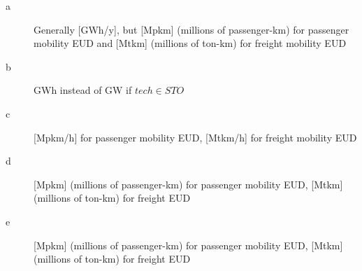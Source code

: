 \documentclass[
]{article}
\begin{document}
\label{citations}
\begin{description}
\item[\label{a}{a}]
Generally {[}GWh/y{]}, but {[}Mpkm{]} (millions of passenger-km) for
passenger mobility EUD and {[}Mtkm{]} (millions of ton-km) for freight
mobility EUD
\item[\label{b}{b}]
GWh instead of GW if \({{tech}} \in {{STO}}\)
\item[\label{c}{c}]
{[}Mpkm/h{]} for passenger mobility EUD, {[}Mtkm/h{]} for freight
mobility EUD
\item[\label{d}{d}]
{[}Mpkm{]} (millions of passenger-km) for passenger mobility EUD,
{[}Mtkm{]} (millions of ton-km) for freight EUD
\item[\label{e}{e}]
{[}Mpkm{]} (millions of passenger-km) for passenger mobility EUD,
{[}Mtkm{]} (millions of ton-km) for freight EUD
\end{description}
\end{document}
